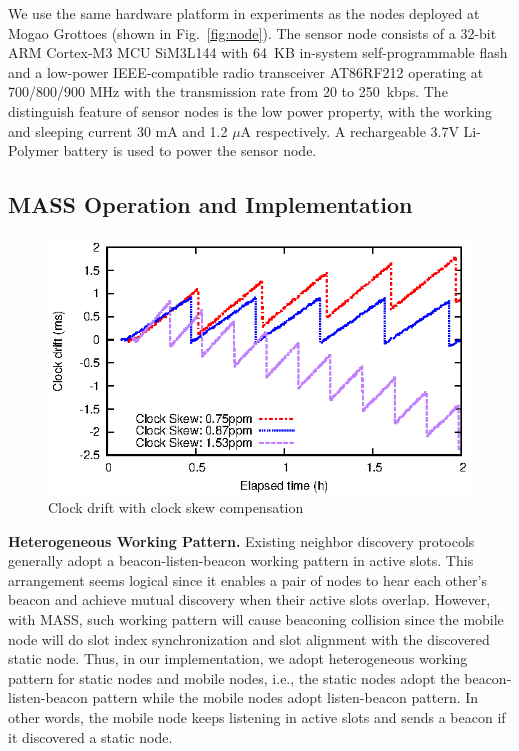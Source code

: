 \documentclass[twoside,twocolumn]{article}
\begin{document}
We use the same hardware platform in experiments as the nodes deployed
at Mogao Grottoes (shown in Fig.~\ref{fig:node}). The sensor node 
consists of a 32-bit ARM Cortex-M3 MCU SiM3L144 with 64~KB in-system
self-programmable flash and a low-power IEEE-compatible radio transceiver 
AT86RF212 operating at 700/800/900 MHz with the transmission rate from 
20 to 250~kbps. The distinguish feature of sensor nodes is the low power 
property, with the working and sleeping current 30 mA and 1.2 $\mu$A 
respectively. A rechargeable 3.7V Li-Polymer battery is used to power 
the sensor node.

\subsection{MASS Operation and Implementation}
\begin{figure}[t]
   \centering
   \includegraphics{graphs/clock-compensation-result/compensate-effect}
   \caption{Clock drift with clock skew compensation}
   \label{fig:compensation}
\end{figure}

{\bf Heterogeneous Working Pattern.} Existing neighbor discovery protocols 
generally adopt a beacon-listen-beacon working pattern in active slots. 
This arrangement seems logical since it enables a pair of nodes to hear 
each other's beacon and achieve mutual discovery when their active slots 
overlap. However, with MASS, such working pattern will cause beaconing 
collision since the mobile node will do slot index synchronization and 
slot alignment with the discovered static node. Thus, in our implementation, 
we adopt heterogeneous working pattern for static nodes and mobile nodes, 
i.e., the static nodes adopt the beacon-listen-beacon pattern while the 
mobile nodes adopt listen-beacon pattern. In other words, the mobile node
keeps listening in active slots and sends a beacon if it discovered a static
node.
\end{document}
